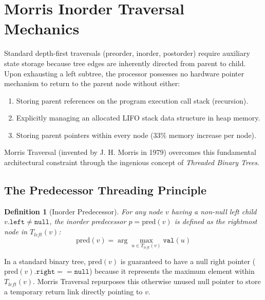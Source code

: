 \documentclass[10pt,twocolumn,letterpaper]{article}
\newtheorem{definition}[theorem]{Definition}
\begin{document}
\section{Morris Inorder Traversal Mechanics}
\label{sec:morris}

Standard depth-first traversals (preorder, inorder, postorder) require auxiliary state storage because tree edges are inherently directed from parent to child. Upon exhausting a left subtree, the processor possesses no hardware pointer mechanism to return to the parent node without either:
\begin{enumerate}
    \item Storing parent references on the program execution call stack (recursion).
    \item Explicitly managing an allocated LIFO stack data structure in heap memory.
    \item Storing parent pointers within every node ($33\%$ memory increase per node).
\end{enumerate}

Morris Traversal (invented by J. H. Morris in 1979) overcomes this fundamental architectural constraint through the ingenious concept of \emph{Threaded Binary Trees}.

\subsection{The Predecessor Threading Principle}

\begin{definition}[Inorder Predecessor]
For any node $v$ having a non-null left child $v.\texttt{left} \neq \texttt{null}$, the inorder predecessor $p = \text{pred}(v)$ is defined as the rightmost node in $T_{left}(v)$:
\[
\text{pred}(v) = \arg\max_{u \in T_{left}(v)} \texttt{val}(u)
\]
\end{definition}

In a standard binary tree, $\text{pred}(v)$ is guaranteed to have a null right pointer ($\text{pred}(v).\texttt{right} == \texttt{null}$) because it represents the maximum element within $T_{left}(v)$. Morris Traversal repurposes this otherwise unused null pointer to store a temporary return link directly pointing to $v$.
\end{document}
